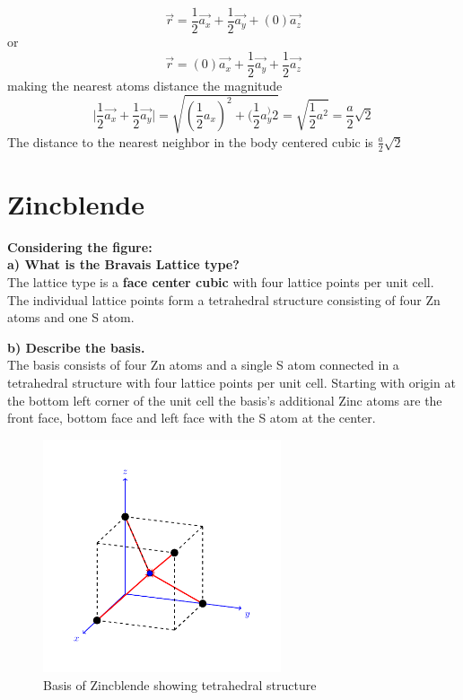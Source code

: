 \documentclass[paper=a4, fontsize=11pt]{scrartcl} %
\numberwithin{equation}{section} %
\numberwithin{figure}{section} %
\numberwithin{table}{section} %
\begin{document}
$$\vec{r} =  \frac{1}{2}\vec{a_x} +\frac{1}{2}\vec{a_y} + (0)\vec{a_z}$$ 
or
$$\vec{r} =  (0)\vec{a_x} +\frac{1}{2}\vec{a_y} + \frac{1}{2}\vec{a_z}$$ 
 making the nearest atoms distance the magnitude
\begin{equation*}
\bigg| \frac{1}{2}\vec{a_x}+\frac{1}{2}\vec{a_y}\bigg| = \sqrt{(\frac{1}{2}a_x)^2+(\frac{1}{2}a_y^)2 } = \sqrt{\frac{1}{2}a^2} = \frac{a}{2}\sqrt{2}
\end{equation*}
The distance to the nearest neighbor in the body centered cubic is $\frac{a}{2}\sqrt{2}$ \\


\section{Zincblende}
\textbf{Considering the figure:} \\
\textbf{a) What is the Bravais Lattice type?}\\
The lattice type is a \textbf{face center cubic} with four lattice points per unit cell. The individual lattice points form a tetrahedral structure consisting of four Zn atoms and one S atom.



\textbf{b) Describe the basis.}\\
The basis consists of four Zn atoms and  a single S atom connected in a tetrahedral structure with four lattice points per unit cell. Starting with origin at the bottom left corner of the unit cell the basis's additional Zinc atoms are the front face, bottom face and left face with the S atom at the center.
\begin{figure}[h]
\includegraphics[width=7cm]{ZnS}
\caption{Basis of Zincblende showing tetrahedral structure}
\end{figure}
\end{document}
